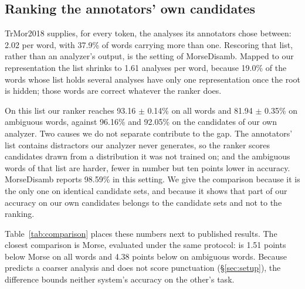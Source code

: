 \subsection{Ranking the annotators' own candidates}
\label{sec:own-candidates}

TrMor2018 supplies, for every token, the analyses its annotators chose between: 2.02 per word, with 37.9\% of words carrying more than one. Rescoring that list, rather than an analyzer's output, is the setting of MorseDisamb. Mapped to our representation the list shrinks to 1.61 analyses per word, because 19.0\% of the words whose list holds several analyses have only one representation once the root is hidden; those words are correct whatever the ranker does.

On this list our ranker reaches 93.16 $\pm$ 0.14\% on all words and 81.94 $\pm$ 0.35\% on ambiguous words, against 96.16\% and 92.05\% on the candidates of our own analyzer. Two causes we do not separate contribute to the gap. The annotators' list contains distractors our analyzer never generates, so the ranker scores candidates drawn from a distribution it was not trained on; and the ambiguous words of that list are harder, fewer in number but ten points lower in accuracy. MorseDisamb reports 98.59\% in this setting. We give the comparison because it is the only one on identical candidate sets, and because it shows that part of our accuracy on our own candidates belongs to the candidate sets and not to the ranking.

Table~\ref{tab:comparison} places these numbers next to published results. The closest comparison is Morse, evaluated under the same protocol: \savyar{} is 1.51 points below Morse on all words and 4.38 points below on ambiguous words. Because \savyar{} predicts a coarser analysis and does not score punctuation (\S\ref{sec:setup}), the difference bounds neither system's accuracy on the other's task.
